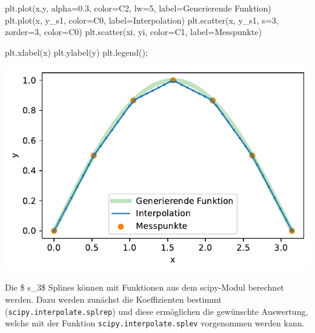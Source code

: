 \documentclass[
  letterpaper,
  DIV=11,
  numbers=noendperiod]{scrreprt}
\newenvironment{Shaded}{\begin{snugshade}}{\end{snugshade}}
\newcommand{\DecValTok}[1]{\textcolor[rgb]{0.68,0.00,0.00}{#1}}
\newcommand{\FloatTok}[1]{\textcolor[rgb]{0.68,0.00,0.00}{#1}}
\newcommand{\NormalTok}[1]{\textcolor[rgb]{0.00,0.23,0.31}{#1}}
\newcommand{\OperatorTok}[1]{\textcolor[rgb]{0.37,0.37,0.37}{#1}}
\newcommand{\StringTok}[1]{\textcolor[rgb]{0.13,0.47,0.30}{#1}}
\begin{document}
\begin{Shaded}
\begin{Highlighting}[]
\NormalTok{plt.plot(x,y, alpha}\OperatorTok{=}\FloatTok{0.3}\NormalTok{, color}\OperatorTok{=}\StringTok{\textquotesingle{}C2\textquotesingle{}}\NormalTok{, lw}\OperatorTok{=}\DecValTok{5}\NormalTok{, }
\NormalTok{         label}\OperatorTok{=}\StringTok{\textquotesingle{}Generierende Funktion\textquotesingle{}}\NormalTok{)}
\NormalTok{plt.plot(x, y\_s1, color}\OperatorTok{=}\StringTok{\textquotesingle{}C0\textquotesingle{}}\NormalTok{, label}\OperatorTok{=}\StringTok{\textquotesingle{}Interpolation\textquotesingle{}}\NormalTok{)}
\NormalTok{plt.scatter(x, y\_s1, s}\OperatorTok{=}\DecValTok{3}\NormalTok{, zorder}\OperatorTok{=}\DecValTok{3}\NormalTok{, color}\OperatorTok{=}\StringTok{\textquotesingle{}C0\textquotesingle{}}\NormalTok{)}
\NormalTok{plt.scatter(xi, yi, color}\OperatorTok{=}\StringTok{\textquotesingle{}C1\textquotesingle{}}\NormalTok{, label}\OperatorTok{=}\StringTok{\textquotesingle{}Messpunkte\textquotesingle{}}\NormalTok{)}

\NormalTok{plt.xlabel(}\StringTok{\textquotesingle{}x\textquotesingle{}}\NormalTok{)}
\NormalTok{plt.ylabel(}\StringTok{\textquotesingle{}y\textquotesingle{}}\NormalTok{)}
\NormalTok{plt.legend()}\OperatorTok{;}
\end{Highlighting}
\end{Shaded}

\includegraphics{books/dataanalysis/splines_files/figure-pdf/cell-6-output-1.pdf}

Die \$ s\_3\$ Splines können mit Funktionen aus dem scipy-Modul
berechnet werden. Dazu werden zunächst die Koeffizienten bestimmt
(\texttt{scipy.interpolate.splrep}) und diese ermöglichen die gewünschte
Auswertung, welche mit der Funktion \texttt{scipy.interpolate.splev}
vorgenommen werden kann.
\end{document}
